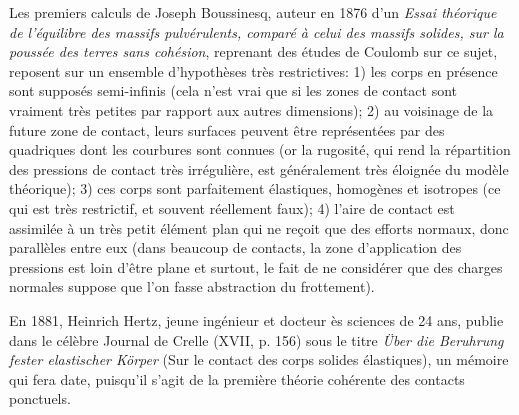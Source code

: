 \medskip
\begin{histoire}%
Les premiers calculs de Joseph Boussinesq, auteur en 1876 d'un \emph{Essai théorique de l'équilibre des massifs pulvérulents, comparé à celui des massifs solides, sur la poussée des terres sans cohésion}, reprenant des études de Coulomb sur ce sujet, reposent sur un ensemble d'hypothèses très restrictives:
1) les corps en présence sont supposés semi-infinis (cela n'est vrai que si les zones de contact sont vraiment très petites par rapport aux autres dimensions);
2) au voisinage de la future zone de contact, leurs surfaces peuvent être représentées par des quadriques dont les courbures sont connues (or la rugosité, qui rend la répartition des pressions de contact très irrégulière, est généralement très éloignée du modèle théorique);
3) ces corps sont parfaitement élastiques, homogènes et isotropes (ce qui est très restrictif, et souvent réellement faux);
4) l'aire de contact est assimilée à un très petit élément plan qui ne reçoit que des efforts normaux, donc parallèles entre eux (dans beaucoup de contacts, la zone d'application des pressions est loin d'être plane et surtout, le fait de ne considérer que des charges normales suppose que l'on fasse abstraction du frottement).

\medskip
En 1881, Heinrich Hertz, jeune ingénieur et docteur ès sciences de 24 ans, publie dans le célèbre Journal de Crelle (XVII, p. 156) sous le titre \emph{Über die Beruhrung fester elastischer Körper} (Sur le contact des corps solides élastiques), un mémoire qui fera date, puisqu'il s'agit de la première théorie cohérente des contacts ponctuels.

\medskip
{}


\end{histoire}
